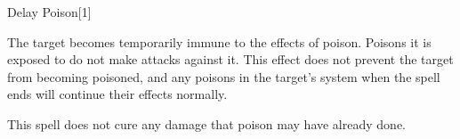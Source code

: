 \begin{spellsection}{Delay Poison}[1]
    \begin{spellheader}
    \end{spellheader}
    \begin{spellcontent}
        \begin{spelltargetinginfo}
        \end{spelltargetinginfo}
        \begin{spelleffects}
            \spelleffect The target becomes temporarily immune to the effects of poison. Poisons it is exposed to do not make attacks against it. This effect does not prevent the target from becoming poisoned, and any poisons in the target's system when the spell ends will continue their effects normally.
            \spelldur \durshort
        \end{spelleffects}
    \end{spellcontent}
    \begin{spellfooter}
        \spellnotes This spell does not cure any damage that poison may have already done.
        \miscastrandom
    \end{spellfooter}
\end{spellsection}

